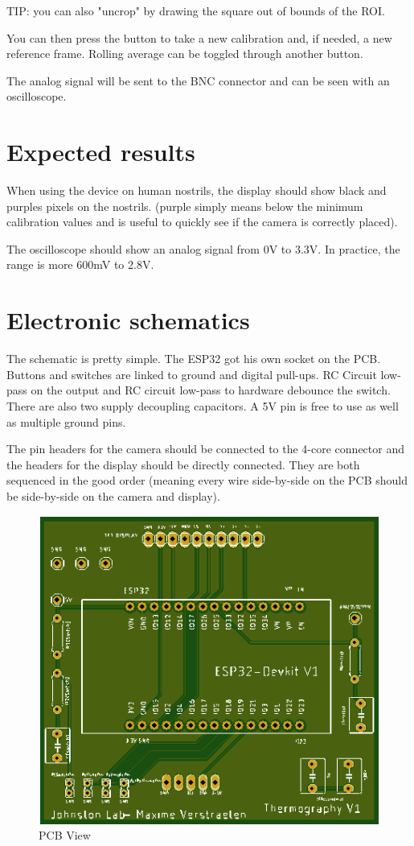 \documentclass[a4paper]{article}
\begin{document}
TIP: you can also "uncrop" by drawing the square out of bounds of the ROI.

You can then press the button to take a new calibration and, if needed, a new reference frame. Rolling average can be toggled through another button.

The analog signal will be sent to the BNC connector and can be seen with an oscilloscope.

\section{Expected results}
When using the device on human nostrils, the display should show black and purples pixels on the nostrils. (purple simply means below the minimum calibration values and is useful to quickly see if the camera is correctly placed).

The oscilloscope should show an analog signal from 0V to 3.3V. In practice, the range is more 600mV to 2.8V.

\section{Electronic schematics}
The schematic is pretty simple.
The ESP32 got his own socket on the PCB.
Buttons and switches are linked to ground and digital pull-ups.
RC Circuit low-pass on the output and RC circuit low-pass to hardware debounce the switch.
There are also two supply decoupling capacitors.
A 5V pin is free to use as well as multiple ground pins.

The pin headers for the camera should be connected to the 4-core connector and the headers for the display should be directly connected. They are both sequenced in the good order (meaning every wire side-by-side on the PCB should be side-by-side on the camera and display).
\begin{figure}
    \centering
    \includegraphics[width = 12cm]{images/PCBViewer.png}
    \caption{PCB View}
    \label{fig:PCBView}
\end{figure}
\end{document}
